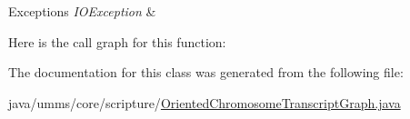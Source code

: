 \begin{DoxyExceptions}{Exceptions}
{\em I\+O\+Exception} & \\
\hline
\end{DoxyExceptions}


Here is the call graph for this function\+:




The documentation for this class was generated from the following file\+:\begin{DoxyCompactItemize}
\item 
java/umms/core/scripture/\hyperlink{_oriented_chromosome_transcript_graph_8java}{Oriented\+Chromosome\+Transcript\+Graph.\+java}\end{DoxyCompactItemize}
